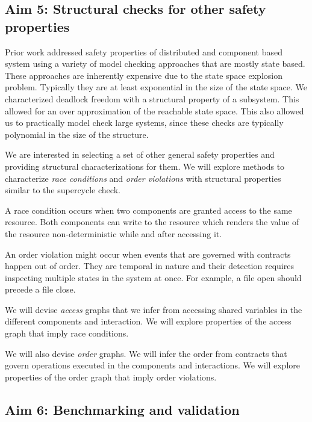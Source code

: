 \subsection{Aim 5: Structural checks for other safety properties} 

Prior work
\cite{AGR16,DBLP:conf/soco/BozgaJMS12,flattening,BonakdarpourBJQS10b,Att99a,AC05,LS92,CousotCousot77-1,LS02,AbdullaHH13VMCAI,PnueliRZ01TACAS,ClarkeKV10Memory}
addressed safety properties of distributed and 
component based system using a variety of model checking
approaches that are mostly state based. 
These approaches are inherently expensive due to the state
space explosion problem. 
Typically they are at least exponential in the size of the 
state space. 
%
We characterized deadlock freedom with a structural property 
of a subsystem. 
This allowed for an over approximation of the reachable state
space. 
This also allowed us to practically model check 
large systems,
since these checks are typically polynomial in the size 
of the structure. 

We are interested in selecting a set of other general safety
properties and providing structural characterizations 
for them.
We will explore methods to characterize {\em race conditions}
and {\em order violations} with structural properties
similar to the supercycle check.

A race condition occurs when two components are granted access
to the same resource. Both components can write to the resource
which renders the value of the resource non-deterministic while
and after accessing it. 

An order violation might occur when events that are governed 
with contracts happen out of order.
They are temporal in nature and their detection requires
inspecting multiple states in the system at once. 
For example, a file open should precede a file close. 

We will devise {\em access} graphs that we infer from 
accessing shared variables in the different components 
and interaction.
We will explore properties of the access graph that 
imply race conditions. 

We will also devise {\em order} graphs. 
We will infer the order from contracts that 
govern operations executed in the components
and interactions. 
We will explore properties of the order graph that 
imply order violations.  

\subsection{Aim 6: Benchmarking and validation } 
 

